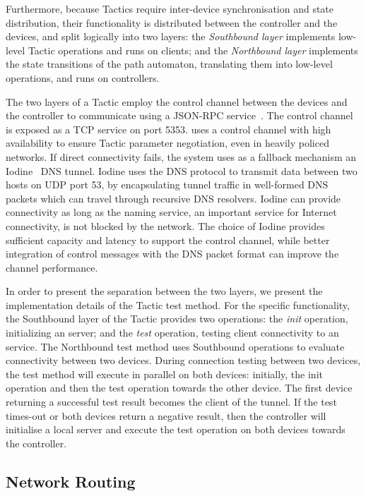 Furthermore, because \signpost Tactics require inter-device synchronisation and
state distribution, their functionality is distributed between the \signpost
controller and the \signpost devices, and split logically into two layers: the
\emph{Southbound layer} implements low-level Tactic operations and runs on
\signpost clients; and the \emph{Northbound layer} implements the state
transitions of the path automaton, translating them into low-level operations,
and runs on \signpost controllers. 

The two layers of a Tactic employ the control channel between the devices and
the \signpost controller to communicate using a JSON-RPC
service~.  The control channel is exposed as a TCP service on
port 5353.  \signpost uses a control channel with high availability to
ensure Tactic parameter negotiation, even in heavily policed networks.  If
direct connectivity fails, the system uses as a fallback mechanism an
Iodine~ DNS tunnel. Iodine uses the DNS protocol to transmit
data between two hosts on UDP port 53, by encapsulating tunnel traffic in
well-formed DNS packets which can travel through recursive DNS resolvers.
Iodine can provide connectivity as long as the naming service, an important
service for Internet connectivity, is not blocked by the network. The choice of
Iodine provides sufficient capacity and latency to support the \signpost
control channel, while better integration of control messages with the DNS
packet format can improve the channel performance. 

In order to present the separation between the two layers, we present the
implementation details of the  \openvpn Tactic test method. For the specific
functionality, the Southbound layer of the Tactic provides two operations: the
\textit{init} operation, initializing an \openvpn server; and the \textit{test}
operation, testing client connectivity to an \openvpn service. The Northbound
test method uses Southbound operations to evaluate connectivity between two
devices. During connection testing between two devices, the test method will execute
in
parallel on both devices: initially, the init operation and then the test
operation towards the other device.  The first device returning a successful test
result becomes the client of the \openvpn tunnel.  If the test times-out or both
devices return a negative result,  then the controller will initialise a local
\openvpn server and execute the test operation on both devices towards the
controller.

\subsection{Network Routing} \label{sec:sp-forwarding}


